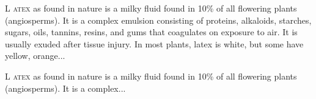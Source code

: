 \documentclass{article}
\newcommand{\TestLettrine}[2]{\lettrine[lines=2, loversize=1.0]{#1}{ #2}}
\begin{document}
\TestLettrine{L}{atex} as found in nature is a milky fluid found in 10\% of
all flowering plants (angiosperms). It is a complex emulsion consisting of
proteins, alkaloids, starches, sugars, oils, tannins, resins, and gums that
coagulates on exposure to air. It is usually exuded after tissue injury. 
In most plants, latex is white, but some have yellow, orange...


\TestLettrine{L}{atex} as found in nature is a milky fluid found in 10\% of
all flowering plants (angiosperms). It is a complex...
\end{document}
